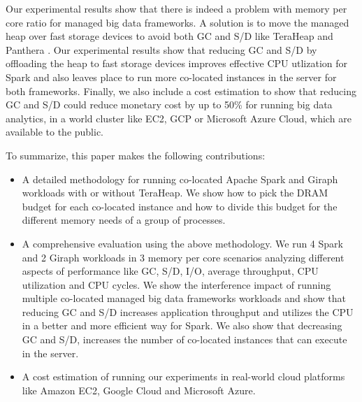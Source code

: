 Our experimental results show that there is indeed a problem with memory per core ratio
for managed big data frameworks.
A solution is to move the managed heap over fast storage devices to avoid both GC and S/D like TeraHeap and Panthera \cite{Panthera}.
Our experimental results show that reducing GC and S/D by offloading the heap to fast storage devices improves effective CPU utlization for Spark and also leaves place to run more co-located instances in the server for both frameworks.
Finally, we also include a cost estimation to show that reducing GC and S/D could reduce monetary cost by up to 50\% for running big data
analytics, in a world cluster like EC2, GCP or Microsoft Azure Cloud, which are available to
the public.

To summarize, this paper makes the following contributions: 
\begin{itemize}
    \item{A detailed methodology for running co-located Apache Spark and Giraph
        workloads with or without TeraHeap. 
	We show how to pick the DRAM budget for each co-located instance and how to divide this budget
		for the different memory needs of a group of processes.
		}

    \item{A comprehensive evaluation using the above methodology.
	    We run 4 Spark and 2 Giraph workloads in 3 memory per core scenarios
	    analyzing different aspects of performance like GC, S/D, I/O, average throughput, CPU utilization and CPU cycles. We show the interference impact of running multiple co-located managed big data frameworks workloads and show that reducing GC and S/D increases application throughput and utilizes the CPU in a better and more efficient way for Spark. We also show that decreasing GC and S/D, increases the number of co-located instances that can execute in the server.}

    \item{A cost estimation of running our experiments in real-world
        cloud platforms like Amazon EC2, Google Cloud and Microsoft
        Azure.}
\end{itemize}
